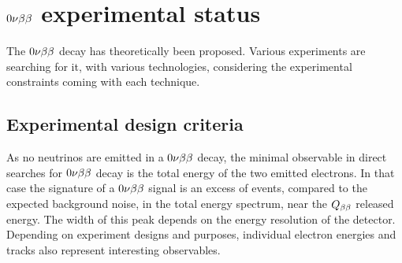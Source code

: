 \section{$0\nu\beta\beta$ experimental status}
\label{sec:0nu_exp}

The $0\nu\beta\beta$ decay has theoretically been proposed.
Various experiments are searching for it, with various technologies, considering the experimental constraints coming with each technique.

\subsection{Experimental design criteria}

As no neutrinos are emitted in a $0\nu\beta\beta$ decay, the minimal observable in direct searches for $0\nu\beta\beta$ decay is the total energy of the two emitted electrons.
In that case the signature of a $0\nu\beta\beta$ signal is an excess of events, compared to the expected background noise, in the total energy spectrum, near the $Q_{\beta\beta}$ released energy.
The width of this peak depends on the energy resolution of the detector.
Depending on experiment designs and purposes, individual electron energies and tracks also represent interesting observables.


